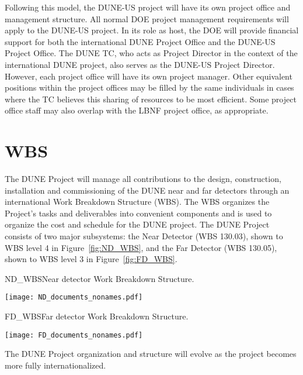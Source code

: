 Following this model, the DUNE-US project will have its own project office and management structure.  All normal
DOE project management requirements will apply to the DUNE-US project.  In its role as host, the DOE will provide
financial support for both the international DUNE Project Office and the DUNE-US Project Office. The DUNE TC,
who acts as Project Director in the context of the international DUNE project, also serves as the DUNE-US Project
Director.  However, each project office will have its own project manager.  Other equivalent positions within the
project offices may be filled by the same individuals in cases where the TC believes this sharing of resources to be
most efficient. Some project office staff may also overlap with the LBNF project office, as appropriate.


\section[Work Breakdown Structure (WBS)]{WBS}

The DUNE Project will manage all contributions to the design,
construction, installation and commissioning of the DUNE near and far
detectors through an international Work Breakdown Structure (WBS).
The WBS organizes the Project's tasks and deliverables into convenient
components and is used to organize the cost and schedule for the DUNE
project. The DUNE Project consists of two major subsystems: the Near Detector
(WBS 130.03), shown to WBS level 4 in Figure~\ref{fig:ND_WBS}, and the
Far Detector (WBS 130.05), shown to WBS level 3 in
Figure~\ref{fig:FD_WBS}.
\begin{cdrfigure}{ND_WBS}{Near detector Work Breakdown Structure.}
\centering
\begin{center}
\texttt{[image: ND\_documents\_nonames.pdf]}
\end{center}
\end{cdrfigure}
\begin{cdrfigure}{FD_WBS}{Far detector Work Breakdown Structure.}
\centering
\begin{center}
\texttt{[image: FD\_documents\_nonames.pdf]}
\end{center}
\end{cdrfigure}
The DUNE Project organization and structure will evolve as the project
becomes more fully internationalized.
